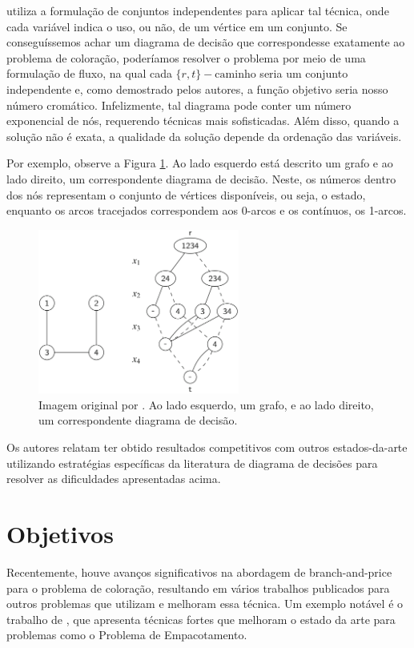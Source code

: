 \documentclass[11pt]{article}
\begin{document}
\textcite{Hoeve2021Graphcoloringdecision} utiliza a formulação de conjuntos independentes para aplicar tal técnica, onde cada variável indica o uso, ou não, de um vértice em um conjunto.
Se conseguíssemos achar um diagrama de decisão que correspondesse exatamente ao problema de coloração, poderíamos resolver o problema por meio de uma formulação de fluxo, na qual cada \(\{r,t\}-\text{caminho}\) seria um conjunto independente e, como demostrado pelos autores, a função objetivo seria nosso número cromático.
Infelizmente, tal diagrama pode conter um número exponencial de nós, requerendo técnicas mais sofisticadas.
Além disso, quando a solução não é exata, a qualidade da solução depende da ordenação das variáveis.

Por exemplo, observe a Figura \ref{fig:diagrama_decisao}.
Ao lado esquerdo está descrito um grafo e ao lado direito, um correspondente diagrama de decisão.
Neste, os números dentro dos nós representam o conjunto de vértices disponíveis, ou seja, o estado, enquanto os arcos tracejados correspondem aos 0-arcos e os contínuos, os 1-arcos.

\begin{figure}[htbp]
\centering
\includegraphics[width=250px]{./diagrama_decisao.png}
\caption{\label{fig:diagrama_decisao}Imagem original por \textcite{Hoeve2021Graphcoloringdecision}. Ao lado esquerdo, um grafo, e ao lado direito, um correspondente diagrama de decisão.}
\end{figure}

Os autores relatam ter obtido resultados competitivos com outros estados-da-arte utilizando estratégias específicas da literatura de diagrama de decisões para resolver as dificuldades apresentadas acima.

\section{Objetivos}
\label{sec:org64da7e3}
Recentemente, houve avanços significativos na abordagem de branch-and-price para o problema de coloração, resultando em vários trabalhos publicados para outros problemas que utilizam e melhoram essa técnica. Um exemplo notável é o trabalho de \textcite{Lima2022Exactsolutionnetwork}, que apresenta técnicas fortes que melhoram o estado da arte para problemas como o Problema de Empacotamento.
\end{document}

